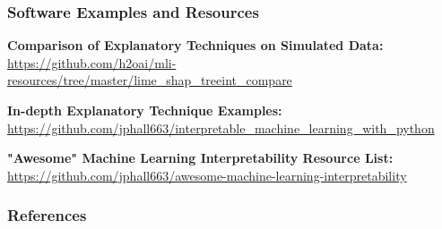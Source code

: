 \documentclass[11pt,
               aspectratio=169
               ]{beamer}
\begin{document}
		\begin{frame}

			\frametitle{Software Examples and Resources}
			
			\textbf{Comparison of Explanatory Techniques on Simulated Data:}\\
			\href{https://github.com/h2oai/mli-resources/tree/master/lime_shap_treeint_compare}{https://github.com/h2oai/mli-resources/tree/master/lime\_shap\_treeint\_compare}\\
			
			\vspace{10pt}
		
			\textbf{In-depth Explanatory Technique Examples:}\\
			\href{https://github.com/jphall663/interpretable_machine_learning_with_python}{https://github.com/jphall663/interpretable\_machine\_learning\_with\_python}\\
			
			\vspace{10pt}
			
			\textbf{"Awesome" Machine Learning Interpretability Resource List:}\\
			\href{https://github.com/jphall663/awesome-machine-learning-interpretability}{https://github.com/jphall663/awesome-machine-learning-interpretability}
			
		\end{frame}



	\begin{frame}[t, allowframebreaks]
	
		\frametitle{References}
		
		\printbibliography
		
	\end{frame}
\end{document}
